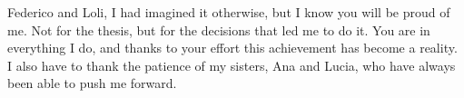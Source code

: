 \begin{acknowledgements}
Federico and Loli, I had imagined it otherwise, but I know you will be proud of me. Not for the thesis, but for the decisions that led me to do it. You are in everything I do, and thanks to your effort this achievement has become a reality. I also have to thank the patience of my sisters, Ana and Lucia, who have always been able to push me forward.



\end{acknowledgements}



